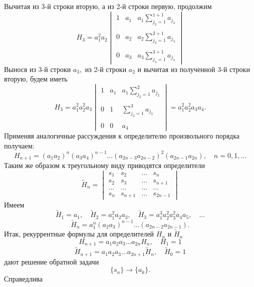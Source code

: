 \documentclass[12 pt, a4 paper]{article}
\theoremstyle{plain}   \newtheorem{Pro}{Задача}
\begin{document}
Вычитая из 3-й строки вторую, а из 2-й строки первую, продолжим
\begin{equation*}
  H_3 =a_1 ^2 a_2
    \begin{vmatrix}
	  1 & a_1 & a_1 \sum _{j_2 =1}^{1+1}a_{j_2} \\
	  \; & \; & \; \\
	  0 & a_2 & a_2 \sum _{j_3 =1}^{2+1}a_{j_3} \\
	  \; & \; & \; \\
	  0 & a_3 & a_3 \sum _{j_4 =1}^{3+1}a_{j_4}
	\end{vmatrix}
\end{equation*}
Вынося из 3-й строки
$ a_3 , $
из 2-й строки
$ a_2 $
и вычитая из полученной 3-й строки вторую, будем иметь
\begin{equation*}
  H_3 =a_1 ^2 a_2 ^2 a_3
    \begin{vmatrix}
	  1 & a_1 & a_1 \sum _{j_2 =1}^2 a_{j_2} \\
	  \; & \; & \; \\
	  0 & 1 & \sum _{j_3 =1}^3 a_{j_3} \\
	  \; & \; & \; \\
	  0 & 0 & a_4
	\end{vmatrix}
	= a_1 ^2 a_2 ^2 a_3 a_4 .
\end{equation*}
Применяя аналогичные рассуждения к определителю произвольного
порядка получаем:
$$
  H_{n+1}=(a_1 a_2 )^n (a_3 a_4 )^{n-1}...
    (a_{2n-3}a_{2n-2})^2 (a_{2n-1}a_{2n}),
	  \quad n=0,1,...
$$
Таким же образом к треугольному виду приводятся определители
\begin{equation*}
  \tilde H_n =
    \begin{vmatrix}
	  s_1 & s_2 & \dots & s_n \\
	  s_2 & s_3 & \dots & s_{n+1} \\
	  \dots & \dots & \dots & \dots \\
	  s_n & s_{n+1} & \dots & s_{2n-1}
	\end{vmatrix}
\end{equation*}
Имеем
$$
  \tilde H_1 =a_1 , \quad
    \tilde H_2 = a_1 ^2 a_2 a_3 , \quad
	  \tilde H_3 = a_1 ^3 a_2 ^2 a_3 ^2 a_4 a_5 ,\quad ...
$$
$$
  \tilde H_n = a_1 ^n (a_2 a_3 )^{n-1}...(a_{2n-2}a_{2n-1}).
$$
Итак, рекуррентные формулы для определителей
$ H_n $
и
$ \tilde H_n $
$$
  H_{n+1}=a_1 a_2 a_3 ...a_{2n} H_n ,
    \quad H_1 =1
$$
$$
  \tilde H_{n+1}=a_1 a_2 a_3 ...a_{2n+1} \tilde H_n ,
    \quad \tilde H_0 =1
$$
дают решение обратной задачи
$$
  \{ s_n \} \longrightarrow \{ a_k \} .
$$
Справедлива
\end{document}

